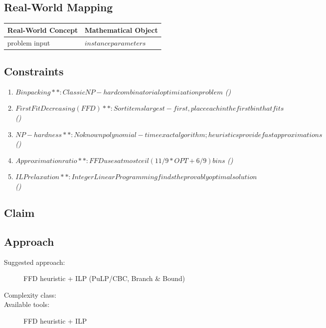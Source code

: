 \documentclass[11pt, a4paper]{article}
\begin{document}
\subsection{Real-World Mapping}

\begin{longtable}{ll}
\toprule
\textbf{Real-World Concept} & \textbf{Mathematical Object} \\
\midrule
\endhead
problem input & $instance parameters$ \\
\bottomrule
\end{longtable}

\subsection{Constraints}

\begin{enumerate}
  \item $Bin packing**: Classic NP-hard combinatorial optimization problem$
  \hfill \textit{()}
  \item $First Fit Decreasing (FFD)**: Sort items largest-first, place each in the first bin that fits$
  \hfill \textit{()}
  \item $NP-hardness**: No known polynomial-time exact algorithm; heuristics provide fast approximations$
  \hfill \textit{()}
  \item $Approximation ratio**: FFD uses at most ceil(11/9 * OPT + 6/9) bins$
  \hfill \textit{()}
  \item $ILP relaxation**: Integer Linear Programming finds the provably optimal solution$
  \hfill \textit{()}
\end{enumerate}

\subsection{Claim}


\subsection{Approach}

\begin{description}
  \item[Suggested approach:] FFD heuristic + ILP (PuLP/CBC, Branch \& Bound)
  \item[Complexity class:] 
  \item[Available tools:] FFD heuristic + ILP
\end{description}
\end{document}
